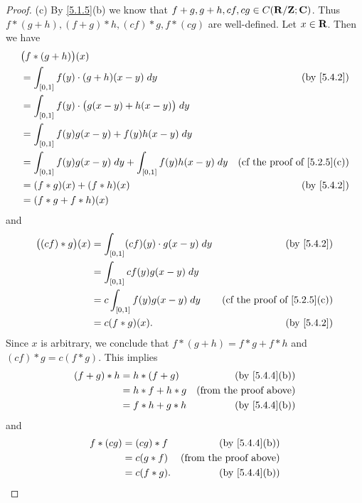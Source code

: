 \begin{proof}{(c)}
  By \cref{5.1.5}(b) we know that \(f + g, g + h, cf, cg \in C(\mathbf{R} / \mathbf{Z} ; \mathbf{C})\).
  Thus \(f * (g + h), (f + g) * h, (cf) * g, f * (cg)\) are well-defined.
  Let \(x \in \mathbf{R}\).
  Then we have
  \begin{align*}
     & \big(f * (g + h)\big)(x)                                                                                           \\
     & = \int_{[0, 1]} f(y) \cdot (g + h)(x - y) \; dy                         & \text{(by \cref{5.4.2})}                 \\
     & = \int_{[0, 1]} f(y) \cdot \big(g(x - y) + h(x - y)\big) \; dy                                                     \\
     & = \int_{[0, 1]} f(y) g(x - y) + f(y) h(x - y) \; dy                                                                \\
     & = \int_{[0, 1]} f(y) g(x - y) \; dy + \int_{[0, 1]} f(y) h(x - y) \; dy & \text{(cf the proof of \cref{5.2.5}(c))} \\
     & = (f * g)(x) + (f * h)(x)                                               & \text{(by \cref{5.4.2})}                 \\
     & = (f * g + f * h)(x)
  \end{align*}
  and
  \begin{align*}
    \big((cf) * g\big)(x) & = \int_{[0, 1]} (cf)(y) \cdot g(x - y) \; dy & \text{(by \cref{5.4.2})}                 \\
                          & = \int_{[0, 1]} c f(y) g(x - y) \; dy                                                   \\
                          & = c \int_{[0, 1]} f(y) g(x - y) \; dy        & \text{(cf the proof of \cref{5.2.5}(c))} \\
                          & = c (f * g)(x).                              & \text{(by \cref{5.4.2})}
  \end{align*}
  Since \(x\) is arbitrary, we conclude that \(f * (g + h) = f * g + f * h\) and \((cf) * g = c (f * g)\).
  This implies
  \begin{align*}
    (f + g) * h & = h * (f + g)   & \text{(by \cref{5.4.4}(b))}   \\
                & = h * f + h * g & \text{(from the proof above)} \\
                & = f * h + g * h & \text{(by \cref{5.4.4}(b))}
  \end{align*}
  and
  \begin{align*}
    f * (cg) & = (cg) * f  & \text{(by \cref{5.4.4}(b))}   \\
             & = c(g * f)  & \text{(from the proof above)} \\
             & = c(f * g). & \text{(by \cref{5.4.4}(b))}
  \end{align*}
\end{proof}

